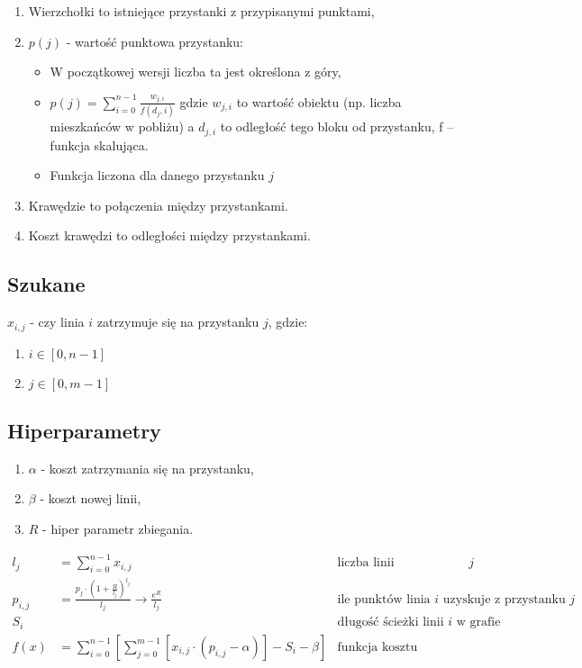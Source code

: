 \documentclass[12pt,a4paper,openright]{mwrep}
\begin{document}
	\begin{enumerate}
		\item Wierzchołki to istniejące przystanki z przypisanymi punktami,
		\item $p(j)$ - wartość punktowa przystanku:
		\begin{itemize}
            \item  W początkowej wersji liczba ta jest określona z góry,
			\item $p(j) = \sum_{i=0}^{n-1} \frac{w_{j, i}}{f(d_j, i)}$ gdzie $w_{j, i}$ to wartość obiektu (np. liczba mieszkańców w pobliżu) a $d_{j,i}$ to odległość tego bloku od przystanku, f – funkcja skalująca.
			\item Funkcja liczona dla danego przystanku $j$
		\end{itemize}
		\item Krawędzie to połączenia między przystankami.
		\item Koszt krawędzi to odległości między przystankami.
	\end{enumerate}










\subsection{Szukane}
	$x_{i,j}$ - czy linia $i$ zatrzymuje się na przystanku $j$, gdzie:
	\begin{enumerate}
		\item $i \in \left[ 0, n-1 \right]$
		\item $j \in \left[ 0, m-1 \right]$
	\end{enumerate}

\subsection{Hiperparametry}
	\begin{enumerate}
		\item $\alpha$ - koszt zatrzymania się na przystanku,
		\item $\beta$ - koszt nowej linii,
		\item $R$ - hiper parametr zbiegania.
	\end{enumerate}


\begin{align*}
	l_j &= \sum_{i=0}^{n-1} x_{i, j}&\text{liczba linii zatrzymujących się na przystanku $j$}\\
	p_{i, j} &= \frac{p_j \cdot (1+\frac{R}{l_j})^{l_j}}{l_j} \xrightarrow{} \frac{e^R}{l_j} &\text{ile punktów linia $i$ uzyskuje z przystanku $j$}\\
	S_{i}&&\text{długość ścieżki linii $i$ w grafie}\\
	f(x) &= \sum_{i=0}^{n-1} \left[ \sum_{j=0}^{m-1} \left[ x_{i,j} \cdot (p_{i,j}-\alpha) \right]-S_{i}-\beta \right]&\text{funkcja kosztu}
\end{align*}
\end{document}
